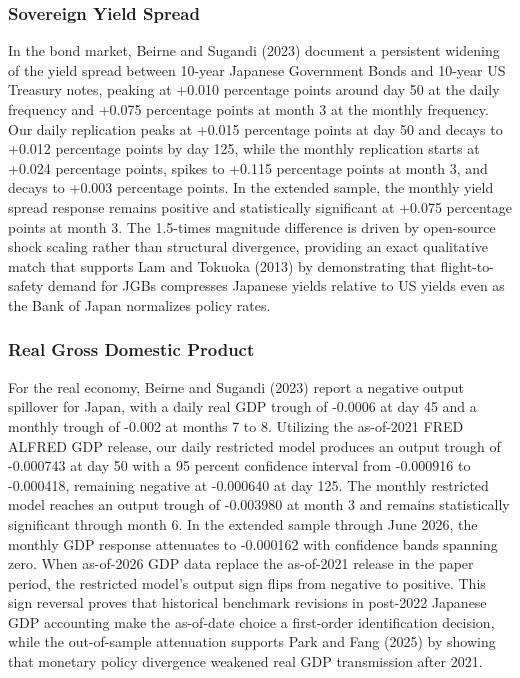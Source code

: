 \subsubsection{Sovereign Yield Spread}

In the bond market, Beirne and Sugandi (2023) document a persistent widening of the yield spread between 10-year Japanese Government Bonds and 10-year US Treasury notes, peaking at +0.010 percentage points around day 50 at the daily frequency and +0.075 percentage points at month 3 at the monthly frequency. Our daily replication peaks at +0.015 percentage points at day 50 and decays to +0.012 percentage points by day 125, while the monthly replication starts at +0.024 percentage points, spikes to +0.115 percentage points at month 3, and decays to +0.003 percentage points. In the extended sample, the monthly yield spread response remains positive and statistically significant at +0.075 percentage points at month 3. The 1.5-times magnitude difference is driven by open-source shock scaling rather than structural divergence, providing an exact qualitative match that supports Lam and Tokuoka (2013) by demonstrating that flight-to-safety demand for JGBs compresses Japanese yields relative to US yields even as the Bank of Japan normalizes policy rates.

\subsubsection{Real Gross Domestic Product}

For the real economy, Beirne and Sugandi (2023) report a negative output spillover for Japan, with a daily real GDP trough of -0.0006 at day 45 and a monthly trough of -0.002 at months 7 to 8. Utilizing the as-of-2021 FRED ALFRED GDP release, our daily restricted model produces an output trough of -0.000743 at day 50 with a 95 percent confidence interval from -0.000916 to -0.000418, remaining negative at -0.000640 at day 125. The monthly restricted model reaches an output trough of -0.003980 at month 3 and remains statistically significant through month 6. In the extended sample through June 2026, the monthly GDP response attenuates to -0.000162 with confidence bands spanning zero. When as-of-2026 GDP data replace the as-of-2021 release in the paper period, the restricted model's output sign flips from negative to positive. This sign reversal proves that historical benchmark revisions in post-2022 Japanese GDP accounting make the as-of-date choice a first-order identification decision, while the out-of-sample attenuation supports Park and Fang (2025) by showing that monetary policy divergence weakened real GDP transmission after 2021.

